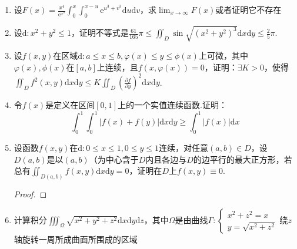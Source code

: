 \begin{enumerate}
	\item 设$F(x)=\frac{x^{4}}{\mathrm{e}^{x^{3}}} \int_{0}^{x} \int_{0}^{x-u} \mathrm{e}^{u^{3}+v^{3}} \mathrm{d} u \mathrm{d} v$，求$\lim _{x \rightarrow \infty} F(x)$或者证明它不存在
	\begin{solution}
	\end{solution}
	
	\item 设$\mathrm{d}: x^{2}+y^{2} \leqslant 1$，证明不等式是$\frac{61}{165} \pi \leqslant \iint_{D} \sin \sqrt{\left(x^{2}+y^{2}\right)^{3}} \mathrm{d} x \mathrm{d} y \leqslant \frac{2}{5} \pi$.
	\begin{solution}
	\end{solution}
	
	\item 设$f(x,y)$在区域$\mathrm{d}: a \leqslant x \leqslant b, \varphi(x) \leqslant y \leqslant \phi(x)$上可微，其中$\varphi(x), \phi(x)$在$[a,b]$上连续，且$f(x, \varphi(x))=0$，证明：$\exists K>0$，使得$\iint_{D} f^{2}(x, y) \mathrm{d} x \mathrm{d} y \leqslant K \iint_{D}\left(\frac{\partial f}{\partial y}\right)^{2} \mathrm{d} x \mathrm{d} y$.
	\begin{solution}
	\end{solution}
	
	\item 令$f(x)$是定义在区间$[0,1]$上的一个实值连续函数.证明：
\[
\int_{0}^{1} \int_{0}^{1}|f(x)+f(y)| \mathrm{d} x \mathrm{d} y \geqslant \int_{0}^{1}|f(x)| \mathrm{d} x
\]
	\begin{solution}
	\end{solution}
	
	\item 设函数$f(x,y)$在$
	\mathrm{d}: 0 \leqslant x \leqslant 1,0 \leqslant y \leqslant 1
	$连续，对任意$(a,b)\in D$，设$D(a,b)$是以$(a,b)$（为中心含于$D$内且各边与$D$的边平行的最大正方形，若总有$
	\iint_{D(a, b)} f(x, y) \mathrm{d} x \mathrm{d} y=0
	$，证明在$D$上$f(x, y) \equiv 0$.
	\begin{proof}
	\end{proof}
	
	\item 计算积分$\iiint_{\Omega} \sqrt{x^{2}+y^{2}+z^{2}} \mathrm{d}x \mathrm{d} y \mathrm{d}z$，其中$\Omega$是由曲线$\Gamma : \left\{\begin{array}{l}{x^{2}+z^{2}=x} \\ {y=\sqrt{x^{2}+z^{2}}}\end{array}\right.$绕$z$轴旋转一周所成曲面所围成的区域
	\begin{solution}
	\end{solution}
	

\end{enumerate}
